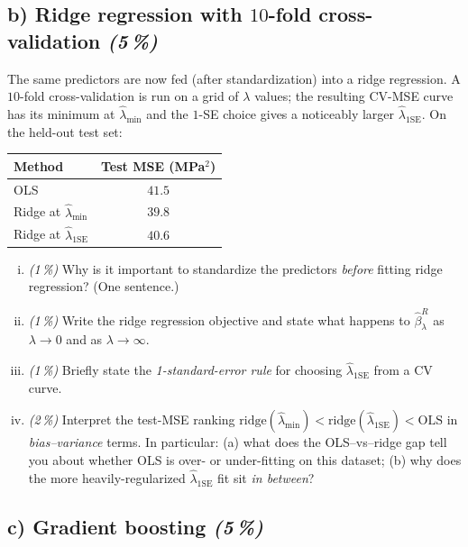 \documentclass[11pt,a4paper]{article}
\newcommand{\subpoints}[1]{\textit{(#1\,\%)}}
\begin{document}
\subsection*{b) Ridge regression with $10$-fold cross-validation \subpoints{5}}

The same predictors are now fed (after standardization) into a ridge regression. A $10$-fold cross-validation is run on a grid of $\lambda$ values; the resulting CV-MSE curve has its minimum at $\hat\lambda_{\min}$ and the $1$-SE choice gives a noticeably larger $\hat\lambda_{1\mathrm{SE}}$. On the held-out test set:

\begin{center}\small
\begin{tabular}{lc}
\toprule
\textbf{Method} & \textbf{Test MSE (MPa$^2$)} \\
\midrule
OLS                                 & $41.5$ \\
Ridge at $\hat\lambda_{\min}$       & $39.8$ \\
Ridge at $\hat\lambda_{1\mathrm{SE}}$ & $40.6$ \\
\bottomrule
\end{tabular}
\end{center}

\begin{enumerate}[(i)]
  \item \subpoints{1} Why is it important to standardize the predictors \emph{before} fitting ridge regression? (One sentence.)
  \item \subpoints{1} Write the ridge regression objective and state what happens to $\hat\beta^R_\lambda$ as $\lambda\to 0$ and as $\lambda\to\infty$.
  \item \subpoints{1} Briefly state the \emph{1-standard-error rule} for choosing $\hat\lambda_{1\mathrm{SE}}$ from a CV curve.
  \item \subpoints{2} Interpret the test-MSE ranking $\text{ridge}(\hat\lambda_{\min})<\text{ridge}(\hat\lambda_{1\mathrm{SE}})<\text{OLS}$ in \emph{bias--variance} terms. In particular: (a) what does the OLS--vs--ridge gap tell you about whether OLS is over- or under-fitting on this dataset; (b) why does the more heavily-regularized $\hat\lambda_{1\mathrm{SE}}$ fit sit \emph{in between}?
\end{enumerate}

\subsection*{c) Gradient boosting \subpoints{5}}
\end{document}

